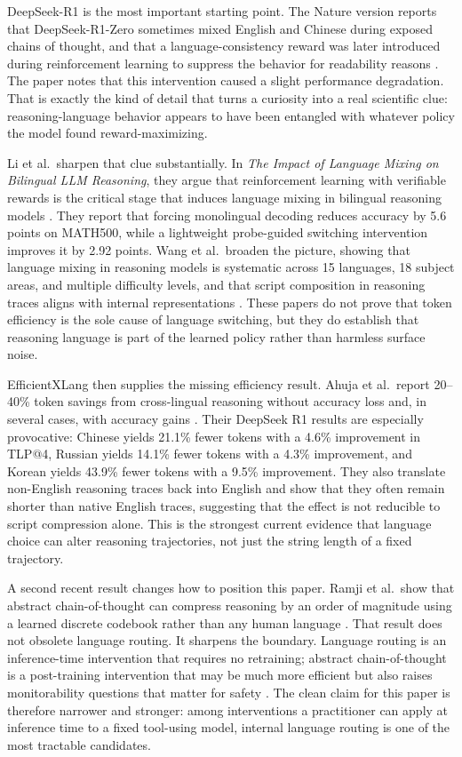 \documentclass[11pt]{article}
\begin{document}
DeepSeek-R1 is the most important starting point. The Nature version reports that DeepSeek-R1-Zero sometimes mixed English and Chinese during exposed chains of thought, and that a language-consistency reward was later introduced during reinforcement learning to suppress the behavior for readability reasons \cite{deepseek2025nature}. The paper notes that this intervention caused a slight performance degradation. That is exactly the kind of detail that turns a curiosity into a real scientific clue: reasoning-language behavior appears to have been entangled with whatever policy the model found reward-maximizing.

Li et al.\ sharpen that clue substantially. In \emph{The Impact of Language Mixing on Bilingual LLM Reasoning}, they argue that reinforcement learning with verifiable rewards is the critical stage that induces language mixing in bilingual reasoning models \cite{li2025bilingual}. They report that forcing monolingual decoding reduces accuracy by 5.6 points on MATH500, while a lightweight probe-guided switching intervention improves it by 2.92 points. Wang et al.\ broaden the picture, showing that language mixing in reasoning models is systematic across 15 languages, 18 subject areas, and multiple difficulty levels, and that script composition in reasoning traces aligns with internal representations \cite{wang2025mixing}. These papers do not prove that token efficiency is the sole cause of language switching, but they do establish that reasoning language is part of the learned policy rather than harmless surface noise.

EfficientXLang then supplies the missing efficiency result. Ahuja et al.\ report 20--40\% token savings from cross-lingual reasoning without accuracy loss and, in several cases, with accuracy gains \cite{ahuja2025efficientxlang}. Their DeepSeek R1 results are especially provocative: Chinese yields 21.1\% fewer tokens with a 4.6\% improvement in TLP@4, Russian yields 14.1\% fewer tokens with a 4.3\% improvement, and Korean yields 43.9\% fewer tokens with a 9.5\% improvement. They also translate non-English reasoning traces back into English and show that they often remain shorter than native English traces, suggesting that the effect is not reducible to script compression alone. This is the strongest current evidence that language choice can alter reasoning trajectories, not just the string length of a fixed trajectory.

A second recent result changes how to position this paper. Ramji et al.\ show that abstract chain-of-thought can compress reasoning by an order of magnitude using a learned discrete codebook rather than any human language \cite{ramji2026abstractcot}. That result does not obsolete language routing. It sharpens the boundary. Language routing is an inference-time intervention that requires no retraining; abstract chain-of-thought is a post-training intervention that may be much more efficient but also raises monitorability questions that matter for safety \cite{baker2025monitoring,metr2025cotinformative}. The clean claim for this paper is therefore narrower and stronger: among interventions a practitioner can apply at inference time to a fixed tool-using model, internal language routing is one of the most tractable candidates.
\end{document}
